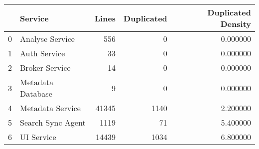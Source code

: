 \begin{tabular}{llrrr}
\toprule
 & Service & Lines & Duplicated & Duplicated Density \\
\midrule
0 & Analyse Service & 556 & 0 & 0.000000 \\
1 & Auth Service & 33 & 0 & 0.000000 \\
2 & Broker Service & 14 & 0 & 0.000000 \\
3 & Metadata Database & 9 & 0 & 0.000000 \\
4 & Metadata Service & 41345 & 1140 & 2.200000 \\
5 & Search Sync Agent & 1119 & 71 & 5.400000 \\
6 & UI Service & 14439 & 1034 & 6.800000 \\
\bottomrule
\end{tabular}
